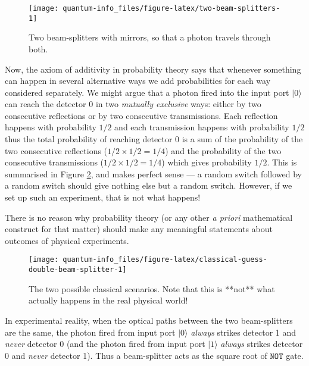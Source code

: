 \documentclass[fleqn]{article}
\newenvironment{idea}{\noindent}{\medskip}
\begin{document}
\begin{figure}[H]

{\centering \texttt{[image: quantum-info\_files/figure-latex/two-beam-splitters-1]} 

}

\caption{Two beam-splitters with mirrors, so that a photon travels through both.}\label{fig:two-beam-splitters}
\end{figure}

Now, the axiom of additivity in probability theory says that whenever something can happen in several alternative ways we add probabilities for each way considered separately.
We might argue that a photon fired into the input port \(|0\rangle\) can reach the detector \(0\) in two \emph{mutually exclusive} ways: either by two consecutive reflections or by two consecutive transmissions.
Each reflection happens with probability \(1/2\) and each transmission happens with probability \(1/2\) thus the total probability of reaching detector 0 is a sum of the probability of the two consecutive reflections (\(1/2\times 1/2 = 1/4\)) and the probability of the two consecutive transmissions (\(1/2\times 1/2 = 1/4\)) which gives probability \(1/2\).
This is summarised in Figure \ref{fig:classical-guess-double-beam-splitter}, and makes perfect sense --- a random switch followed by a random switch should give nothing else but a random switch.
However, if we set up such an experiment, that is not what happens!

\begin{idea}

There is no reason why probability theory (or any other \emph{a priori} mathematical construct for that matter) should make any meaningful statements about outcomes of physical experiments.

\end{idea}

\begin{figure}[H]

{\centering \texttt{[image: quantum-info\_files/figure-latex/classical-guess-double-beam-splitter-1]} 

}

\caption{The two possible classical scenarios. Note that this is **not** what actually happens in the real physical world!}\label{fig:classical-guess-double-beam-splitter}
\end{figure}

In experimental reality, when the optical paths between the two beam-splitters are the same, the photon fired from input port \(|0\rangle\) \emph{always} strikes detector 1 and \emph{never} detector 0 (and the photon fired from input port \(|1\rangle\) \emph{always} strikes detector 0 and \emph{never} detector 1).
Thus a beam-splitter acts as the square root of \(\texttt{NOT}\) gate.
\end{document}
